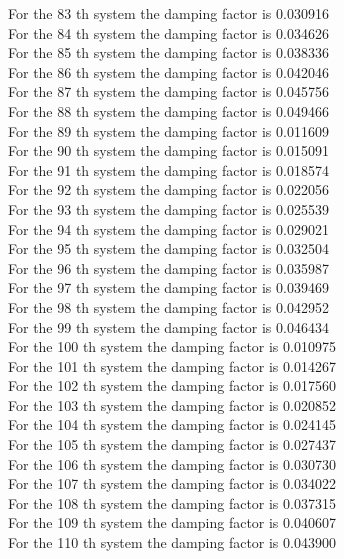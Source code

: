 \documentclass[11pt]{article}
\begin{document}
For the 83 th system the damping factor is 0.030916 \\
For the 84 th system the damping factor is 0.034626 \\
For the 85 th system the damping factor is 0.038336 \\
For the 86 th system the damping factor is 0.042046 \\
For the 87 th system the damping factor is 0.045756 \\
For the 88 th system the damping factor is 0.049466 \\
For the 89 th system the damping factor is 0.011609 \\
For the 90 th system the damping factor is 0.015091 \\
For the 91 th system the damping factor is 0.018574 \\
For the 92 th system the damping factor is 0.022056 \\
For the 93 th system the damping factor is 0.025539 \\
For the 94 th system the damping factor is 0.029021 \\
For the 95 th system the damping factor is 0.032504 \\
For the 96 th system the damping factor is 0.035987 \\
For the 97 th system the damping factor is 0.039469 \\
For the 98 th system the damping factor is 0.042952 \\
For the 99 th system the damping factor is 0.046434 \\
For the 100 th system the damping factor is 0.010975 \\
For the 101 th system the damping factor is 0.014267 \\
For the 102 th system the damping factor is 0.017560 \\
For the 103 th system the damping factor is 0.020852 \\
For the 104 th system the damping factor is 0.024145 \\
For the 105 th system the damping factor is 0.027437 \\
For the 106 th system the damping factor is 0.030730 \\
For the 107 th system the damping factor is 0.034022 \\
For the 108 th system the damping factor is 0.037315 \\
For the 109 th system the damping factor is 0.040607 \\
For the 110 th system the damping factor is 0.043900 \\
\end{document}
